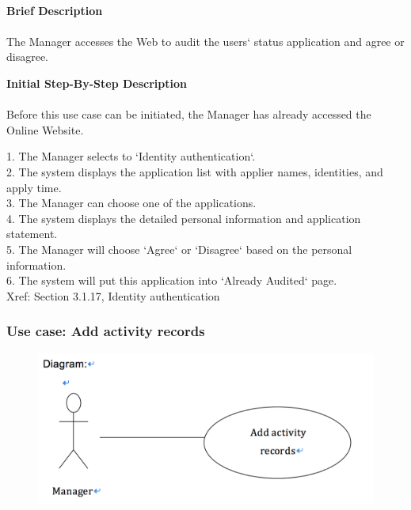 \documentclass[12pt]{report}
\begin{document}
\paragraph{}
\begin{flushleft}
\textbf{Brief Description }
\paragraph{}
The Manager accesses the Web to audit the users` status application and agree or disagree. \\

\begin{flushleft}
\textbf{Initial Step-By-Step Description }
\paragraph{}
Before this use case can be initiated, the Manager has already accessed the Online Website.

\begin{flushleft}
1.	The Manager selects to `Identity authentication`. \\
2.	The system displays the application list with applier names, identities, and apply time. \\
3.	The Manager can choose one of the applications. \\
4.	The system displays the detailed personal information and application statement. \\
5.	The Manager will choose `Agree` or `Disagree` based on the personal information.  \\
6.	The system will put this application into `Already Audited` page. \\
Xref: Section 3.1.17, Identity authentication
\end{flushleft}
\end{flushleft}
\end{flushleft}


\newpage
\subsubsection{Use case:  Add activity records }

\begin{figure}[!htb]
  \includegraphics{24.PNG}
\end{figure}
\end{document}
